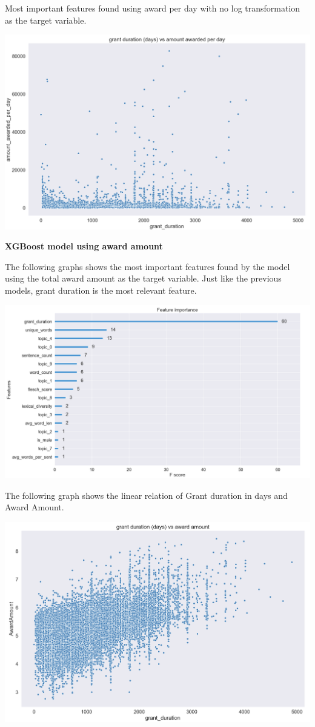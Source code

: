 \documentclass[11pt, oneside]{article}   	%
\begin{document}
Most important features found using award per day with no log transformation as the target variable.

\includegraphics[width=\textwidth]{xgbScatterAwardPerDayNoLog}

 \textbf{ XGBoost model using award amount}
 
The following graphs shows the most important features found by the model using the total award amount as the target variable. Just like the previous models, grant duration is the most relevant feature.
 
\includegraphics[width=\textwidth]{xgbAwardAmount}

The  following graph shows the linear relation of Grant duration in days and Award Amount.

\includegraphics[width=\textwidth]{xgbScatterAwardAmount}
\end{document}
